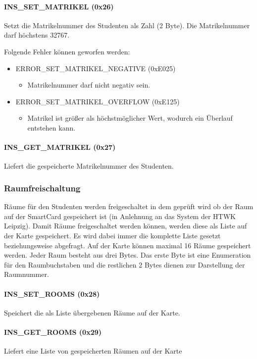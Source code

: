 \paragraph{INS\_SET\_MATRIKEL (0x26)}
Setzt die Matrikelnummer des Studenten als Zahl (2 Byte).
Die Matrikelnummer darf höchstens 32767.

Folgende Fehler können geworfen werden:
\begin{itemize}
	\item ERROR\_SET\_MATRIKEL\_NEGATIVE (0xE025)
	\begin{itemize}
		\item Matrikelnummer darf nicht negativ sein.
	\end{itemize}
	\item ERROR\_SET\_MATRIKEL\_OVERFLOW (0xE125)
	\begin{itemize}
		\item Matrikel ist größer als höchstmöglicher Wert, wodurch ein Überlauf entstehen kann.
	\end{itemize}
\end{itemize}

\paragraph{INS\_GET\_MATRIKEL (0x27)}
Liefert die gespeicherte Matrikelnummer des Studenten.

\subsubsection{Raumfreischaltung}
Räume für den Studenten werden freigeschaltet in dem geprüft wird ob der Raum auf der SmartCard gespeichert ist (in Anlehnung an das System der HTWK Leipzig).
Damit Räume freigeschaltet werden können, werden diese als Liste auf der Karte gespeichert.
Es wird dabei immer die komplette Liste gesetzt beziehungsweise abgefragt.
Auf der Karte können maximal 16 Räume gespeichert werden.
Jeder Raum besteht aus drei Bytes.
Das erste Byte ist eine Enumeration für den Raumbuchstaben und die restlichen 2 Bytes dienen zur Darstellung der Raumnummer.

\paragraph{INS\_SET\_ROOMS (0x28)}
Speichert die als Liste übergebenen Räume auf der Karte.
\paragraph{INS\_GET\_ROOMS (0x29)}
Liefert eine Liste von gespeicherten Räumen auf der Karte

